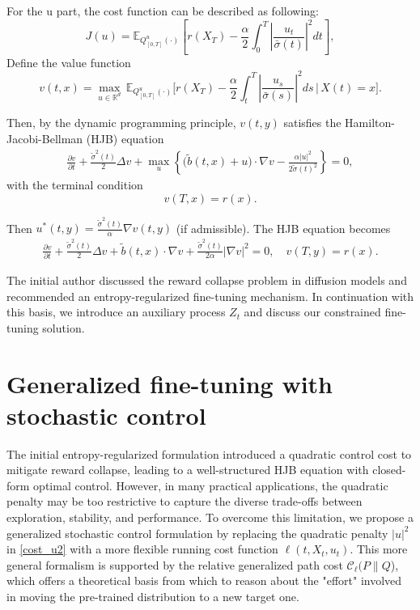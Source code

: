 \documentclass[11pt]{article}
\def\w{\widetilde}
\begin{document}
For the u part, the cost function can be described as following:
\begin{equation}
\label{cost_u2}
    J(u) ={\mathbb{E}_{Q^{u}_{[0,T]}(\cdot)}}\left[r(X_T)-\frac{\alpha}{2} \int_0^T |\frac{u_t}{\bar{\sigma}(t)}|^2dt   \right],
\end{equation}
Define the value function
\begin{equation}
v(t,x)=\max_{u\in\mathbb{R}^{d}}\,{\mathbb{E}_{Q^{u}_{[0,T]}(\cdot)}}\Big[r(X_T)-\frac{\alpha}{2}\int_t^T|\frac{u_s}{ \bar{\sigma} (s)}|^2ds \,\Big|\, X(t)=x\Big].
\end{equation}

Then, by the dynamic programming principle, \(v(t,y)\) satisfies the Hamilton-Jacobi-Bellman (HJB) equation
\begin{equation}
\begin{aligned}
\frac{\partial v}{\partial t}+\frac{\w{\sigma}^2(t)}{2}\Delta v+\max_{u}\left\{\Big(\w{b}(t,x)+u\Big)\cdot\nabla v-\frac{\alpha|u|^2}{2\w{\sigma} (t)^2}\right\}=0,
\end{aligned}
\end{equation}
with the terminal condition
\[
v(T,x)=r(x).
\]

Then $u^*(t,y)=\frac{\w{\sigma}^2(t)}{\alpha}\nabla v(t,y)$ (if admissible). The HJB equation becomes
\begin{equation}
\begin{aligned}
\frac{\partial v}{\partial t}+\frac{\w{\sigma}^2(t)}{2}\Delta v+\w{b}(t,x)\cdot\nabla v+\frac{\w\sigma^2(t)}{2\alpha}|\nabla v|^2=0,\quad v(T,y)=r(x).
\end{aligned}
\end{equation}


The initial author discussed the reward collapse problem in diffusion models and recommended an entropy-regularized fine-tuning mechanism. In continuation with this basis, we introduce an auxiliary process $Z_t$ and discuss our constrained fine-tuning solution.


\section{Generalized fine-tuning with stochastic control}
%


The initial entropy-regularized formulation introduced a quadratic control cost to mitigate reward collapse, leading to a well-structured HJB equation with closed-form optimal control. However, in many practical applications, the quadratic penalty may be too restrictive to capture the diverse trade-offs between exploration, stability, and performance. To overcome this limitation, we propose a generalized stochastic control formulation by replacing the quadratic penalty $|u|^2$ in \eqref{cost_u2} with a more flexible running cost function $\ell(t, X_t, u_t)$. This more general formalism is supported by the relative generalized path cost $\mathcal C_\ell(P\|Q$), which offers a theoretical basis from which to reason about the "effort" involved in moving the pre-trained distribution to a new target one. 
\end{document}
